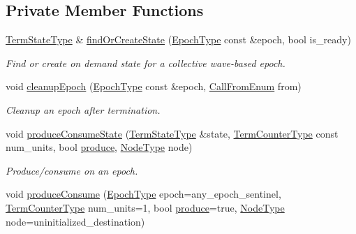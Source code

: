\subsection*{Private Member Functions}
\begin{DoxyCompactItemize}
\item 
\hyperlink{structvt_1_1term_1_1_term_action_ae4c635b69751d887666814700ed64d65}{Term\+State\+Type} \& \hyperlink{structvt_1_1term_1_1_termination_detector_a7fae7c4264078f157ceb79df1ee5c458}{find\+Or\+Create\+State} (\hyperlink{namespacevt_a985a5adf291c34a3ca263b3378388236}{Epoch\+Type} const \&epoch, bool is\+\_\+ready)
\begin{DoxyCompactList}\small\item\em Find or create on demand state for a collective wave-\/based epoch. \end{DoxyCompactList}\item 
void \hyperlink{structvt_1_1term_1_1_termination_detector_a40a2ebe4e220dace273cc6570dd70b01}{cleanup\+Epoch} (\hyperlink{namespacevt_a985a5adf291c34a3ca263b3378388236}{Epoch\+Type} const \&epoch, \hyperlink{structvt_1_1term_1_1_termination_detector_a4f3ede9a87f39d86e85f92b36a6c6a30}{Call\+From\+Enum} from)
\begin{DoxyCompactList}\small\item\em Cleanup an epoch after termination. \end{DoxyCompactList}\item 
void \hyperlink{structvt_1_1term_1_1_termination_detector_a048f9a1dc93ec837a3f885ebae77ddb4}{produce\+Consume\+State} (\hyperlink{structvt_1_1term_1_1_term_action_ae4c635b69751d887666814700ed64d65}{Term\+State\+Type} \&state, \hyperlink{namespacevt_1_1term_a4fd378cdb0c36683afc1b3399d685f7f}{Term\+Counter\+Type} const num\+\_\+units, bool \hyperlink{structvt_1_1term_1_1_termination_detector_a3c31a1c36b5d55e9d28b5b26b2436573}{produce}, \hyperlink{namespacevt_a866da9d0efc19c0a1ce79e9e492f47e2}{Node\+Type} node)
\begin{DoxyCompactList}\small\item\em Produce/consume on an epoch. \end{DoxyCompactList}\item 
void \hyperlink{structvt_1_1term_1_1_termination_detector_a3e06098a7b54106910ea9000e2571a39}{produce\+Consume} (\hyperlink{namespacevt_a985a5adf291c34a3ca263b3378388236}{Epoch\+Type} epoch=any\+\_\+epoch\+\_\+sentinel, \hyperlink{namespacevt_1_1term_a4fd378cdb0c36683afc1b3399d685f7f}{Term\+Counter\+Type} num\+\_\+units=1, bool \hyperlink{structvt_1_1term_1_1_termination_detector_a3c31a1c36b5d55e9d28b5b26b2436573}{produce}=true, \hyperlink{namespacevt_a866da9d0efc19c0a1ce79e9e492f47e2}{Node\+Type} node=uninitialized\+\_\+destination)

\end{DoxyCompactItemize}
